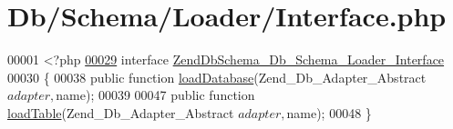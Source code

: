 \hypertarget{Loader_2Interface_8php_source}{\section{\-Db/\-Schema/\-Loader/\-Interface.php}
}

\begin{DoxyCode}
00001 <?php
\hypertarget{Loader_2Interface_8php_source_l00029}{}\hyperlink{interfaceZendDbSchema__Db__Schema__Loader__Interface}{00029} \textcolor{keyword}{interface }\hyperlink{interfaceZendDbSchema__Db__Schema__Loader__Interface}{ZendDbSchema_Db_Schema_Loader_Interface}
00030 \{
00038     \textcolor{keyword}{public} \textcolor{keyword}{function} \hyperlink{interfaceZendDbSchema__Db__Schema__Loader__Interface_a1c1c3235cdcb31939507aa988a4df708}{loadDatabase}(Zend\_Db\_Adapter\_Abstract $adapter, $name);
00039 
00047     \textcolor{keyword}{public} \textcolor{keyword}{function} \hyperlink{interfaceZendDbSchema__Db__Schema__Loader__Interface_acc4d40a1927e6c3679d6070956683fb6}{loadTable}(Zend\_Db\_Adapter\_Abstract $adapter, $name);
00048 \}
\end{DoxyCode}
